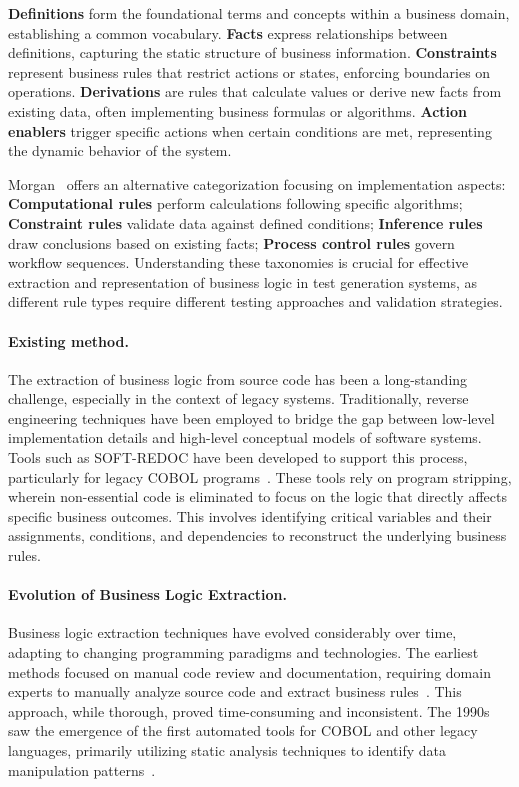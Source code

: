 \hspace{0.5cm} \textbf{Definitions} form the foundational terms and concepts within a business domain, establishing a common vocabulary. \textbf{Facts} express relationships between definitions, capturing the static structure of business information. \textbf{Constraints} represent business rules that restrict actions or states, enforcing boundaries on operations. \textbf{Derivations} are rules that calculate values or derive new facts from existing data, often implementing business formulas or algorithms. \textbf{Action enablers} trigger specific actions when certain conditions are met, representing the dynamic behavior of the system.

\hspace{0.5cm} Morgan~\cite{MorganBusinessRules} offers an alternative categorization focusing on implementation aspects: \textbf{Computational rules} perform calculations following specific algorithms; \textbf{Constraint rules} validate data against defined conditions; \textbf{Inference rules} draw conclusions based on existing facts; \textbf{Process control rules} govern workflow sequences. Understanding these taxonomies is crucial for effective extraction and representation of business logic in test generation systems, as different rule types require different testing approaches and validation strategies.

\paragraph{Existing method.} The extraction of business logic from source code has been a long-standing challenge, especially in the context of legacy systems. Traditionally, reverse engineering techniques have been employed to bridge the gap between low-level implementation details and high-level conceptual models of software systems. Tools such as SOFT-REDOC have been developed to support this process, particularly for legacy COBOL programs~\cite{BusinessRules}. These tools rely on program stripping, wherein non-essential code is eliminated to focus on the logic that directly affects specific business outcomes. This involves identifying critical variables and their assignments, conditions, and dependencies to reconstruct the underlying business rules.

\paragraph{Evolution of Business Logic Extraction.} Business logic extraction techniques have evolved considerably over time, adapting to changing programming paradigms and technologies. The earliest methods focused on manual code review and documentation, requiring domain experts to manually analyze source code and extract business rules~\cite{ManualBLExtraction}. This approach, while thorough, proved time-consuming and inconsistent. The 1990s saw the emergence of the first automated tools for COBOL and other legacy languages, primarily utilizing static analysis techniques to identify data manipulation patterns~\cite{BusinessRules}.

